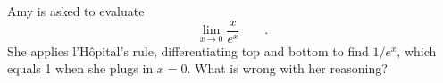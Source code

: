 Amy is asked to evaluate
\begin{equation*}
  \lim_{x\rightarrow 0} \frac{x}{e^x} \qquad .
\end{equation*}
She applies l'H\^{o}pital's rule, differentiating top and bottom to find
$1/e^x$, which equals 1 when she plugs in $x=0$. What is wrong with her reasoning?
